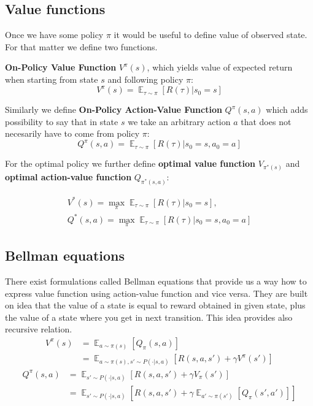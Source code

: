\subsection*{Value functions}
Once we have some policy $\pi$ it would be useful to define value of observed state. 
For that matter we define two functions.

\textbf{On-Policy Value Function} $V^\pi(s)$, which yields value of expected return when starting from state $s$ and following policy $\pi$:
$$V^\pi(s) = \mathop{\mathbb{E}}_{\tau \sim \pi}[R(\tau)|s_0=s]$$

Similarly we define \textbf{On-Policy Action-Value Function} $Q^\pi(s,a)$ which adds possibility to say that in state $s$ we take an arbitrary action $a$ that does not necesarily have to come from policy $\pi$:
$$Q^\pi(s,a) = \mathop{\mathbb{E}}_{\tau \sim \pi}[R(\tau)|s_0=s,a_0=a]$$

For the optimal policy we further define \textbf{optimal value function} $V_{\pi^*(s)}$ and \textbf{optimal action-value function} $Q_{\pi^*(s,a)}$:

\begin{gather*}
    V^*(s) = \max_\pi \mathop{\mathbb{E}}_{\tau \sim \pi}[R(\tau)|s_0=s], \\
    Q^*(s,a) = \max_\pi \mathop{\mathbb{E}}_{\tau \sim \pi}[R(\tau)|s_0=s,a_0=a]
\end{gather*}

\subsection*{Bellman equations}
There exist formulations called Bellman equations that provide us a way how to express value function using action-value function and vice versa.
They are built on idea that the value of a state is equal to reward obtained in given state, plus the value of a state where you get in next transition. 
This idea provides also recursive relation. 
\begin{align*}
    V^\pi(s) &= \mathop{\mathbb{E}}_{a \sim \pi(s)} [Q_\pi(s,a)] \\
    &= \mathop{\mathbb{E}}_{a \sim \pi(s), s' \sim P(\cdot|s,a)} [R(s,a, s') + \gamma V^\pi(s')]
\end{align*}
\begin{align*}
    Q^\pi(s,a) &= \mathop{\mathbb{E}}_{s' \sim P(\cdot|s,a)} [R(s,a,s') + \gamma V_\pi(s')] \\
    &= \mathop{\mathbb{E}}_{s' \sim P(\cdot|s,a)} [R(s,a,s') + \gamma \mathop{\mathbb{E}}_{a' \sim \pi(s')} [Q_\pi(s',a')]]
\end{align*}

